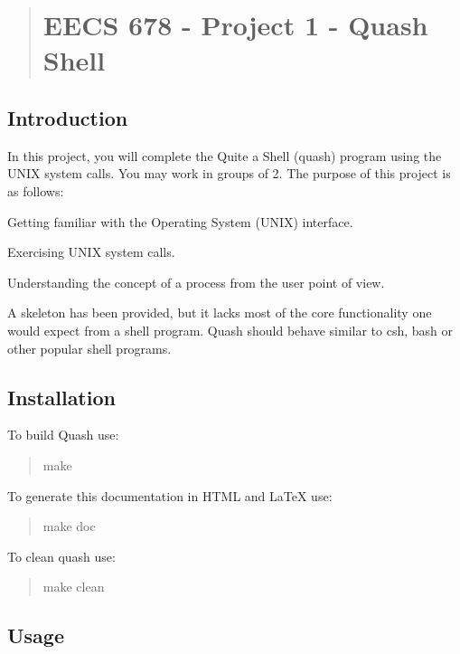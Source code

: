 \begin{quote}
\section*{E\+E\+CS 678 -\/ Project 1 -\/ Quash Shell}

\end{quote}


\subsection*{Introduction}

In this project, you will complete the Quite a Shell (quash) program using the U\+N\+IX system calls. You may work in groups of 2. The purpose of this project is as follows\+:


\begin{DoxyItemize}
\item Getting familiar with the Operating System (U\+N\+IX) interface.
\item Exercising U\+N\+IX system calls.
\item Understanding the concept of a process from the user point of view.
\end{DoxyItemize}

A skeleton has been provided, but it lacks most of the core functionality one would expect from a shell program. Quash should behave similar to csh, bash or other popular shell programs.

\subsection*{Installation}

To build Quash use\+: \begin{quote}
{\ttfamily make} \end{quote}


To generate this documentation in H\+T\+ML and La\+TeX use\+: \begin{quote}
{\ttfamily make doc} \end{quote}


To clean quash use\+: \begin{quote}
{\ttfamily make clean} \end{quote}


\subsection*{Usage}

